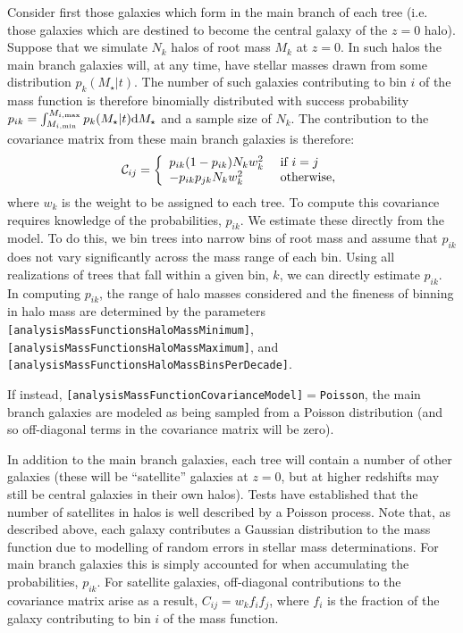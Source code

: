 Consider first those galaxies which form in the main branch of each tree (i.e. those galaxies which are destined to become the central galaxy of the $z=0$ halo). Suppose that we simulate $N_k$ halos of root mass $M_k$ at $z=0$. In such halos the main branch galaxies will, at any time, have stellar masses drawn from some distribution $p_k(M_\star|t)$. The number of such galaxies contributing to bin $i$ of the mass function is therefore binomially distributed with success probability $p_{ik} = \int_{M_{i,\rm min}}^{M_{i,\rm max}} p_k(M_\star|t) \d M_\star$ and a sample size of $N_k$. The contribution to the covariance matrix from these main branch galaxies is therefore:
\begin{equation}
 \mathcal{C}_{ij} = \left\{ \begin{array}{ll} p_{ik}(1-p_{ik}) N_k w_k^2 & \hbox{ if } i = j \\ -p_{ik} p_{jk} N_k w_k^2 & \hbox{ otherwise,} \end{array} \right.
\end{equation}
where $w_k$ is the weight to be assigned to each tree. To compute this covariance requires knowledge of the probabilities, $p_{ik}$. We estimate these directly from the model. To do this, we bin trees into narrow bins of root mass and assume that $p_{ik}$ does not vary significantly across the mass range of each bin. Using all realizations of trees that fall within a given bin, $k$, we can directly estimate $p_{ik}$. In computing $p_{ik}$, the range of halo masses considered and the fineness of binning in halo mass are determined by the parameters {\tt [analysisMassFunctionsHaloMassMinimum]}, {\tt [analysisMassFunctionsHaloMassMaximum]}, and {\tt [analysisMassFunctionsHaloMassBinsPerDecade]}.

If instead, {\tt [analysisMassFunctionCovarianceModel]}$=${\tt Poisson}, the main branch galaxies are modeled as being sampled from a Poisson distribution (and so off-diagonal terms in the covariance matrix will be zero). 

In addition to the main branch galaxies, each tree will contain a number of other galaxies (these will be ``satellite'' galaxies at $z=0$, but at higher redshifts may still be central galaxies in their own halos). Tests have established that the number of satellites in halos is well described by a Poisson process. Note that, as described above, each galaxy contributes a Gaussian distribution to the mass function due to modelling of random errors in stellar mass determinations. For main branch galaxies this is simply accounted for when accumulating the probabilities, $p_{ik}$. For satellite galaxies, off-diagonal contributions to the covariance matrix arise as a result, $C_{ij} = w_k f_i f_j$, where $f_i$ is the fraction of the galaxy contributing to bin $i$ of the mass function.

